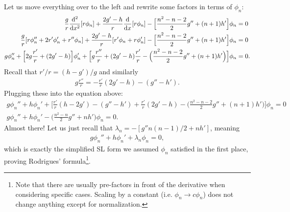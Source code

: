 Let us move everything over to the left and rewrite some factors in terms of $\phi_{n}$:
\begin{align}
    \frac{g}{r} \dv[2]{x} [r\phi_{n}] + \frac{2g' - h}{r} \dv{x} [r\phi_{n}] - \Big[ \frac{n^2-n-2}{2} g'' + (n+1) h' \Big] \phi_{n} &= 0 \nonumber \\
    \frac{g}{r} [ r\phi_{n}'' + 2r'\phi_{n}' + r'' \phi_{n} ] + \frac{2g' - h}{r} [ r'\phi_{n} + r\phi_{n}' ] - \Big[ \frac{n^2 - n - 2}{2} g'' + (n+1) h' \Big] \phi_{n} &= 0 \nonumber \\
    g \phi_{n}'' + \Big[ 2 g \frac{r'}{r} + (2g'-h) \Big] \phi_{n}' + \Big[ g \frac{r''}{r} + (2g' - h) \frac{r'}{r} - \Big( \frac{n^2 - n - 2}{2} g'' + (n+1)h' \Big) \Big] \phi_{n} &= 0
.\end{align}
Recall that $r'/r = (h - g')/g$ and similarly
\begin{eqnarray}
    g\frac{r''}{r} = -\frac{r'}{r} (2g' - h) - (g'' - h')
.\end{eqnarray}
Plugging these into the equation above:
\begin{gather}
    g \phi_{n}'' + h \phi_{n}' + \Big[ \frac{r'}{r}(h - 2g') - (g'' - h') + \frac{r'}{r}(2g' - h) - \Big( \frac{n^2 - n - 2}{2} g'' + (n+1)h' \Big) \Big] \phi_{n} = 0 \nonumber \\
    g \phi_{n}'' + h\phi_{n}' - \Big( \frac{n^2 - n}{2} g'' + n h' \Big) \phi_{n} = 0
.\end{gather}
Almost there!
Let us just recall that $\lambda_{n} = -[ g'' n(n-1)/2 + n h']$, meaning
\begin{eqnarray}
    g \phi_{n}'' + h \phi_{n}' + \lambda_{n} \phi_{n} = 0
,\end{eqnarray}
which is exactly the simplified SL form we assumed $\phi_{n}$ satisfied in the first place, proving Rodrigues' formula\footnote{Note that there are usually pre-factors in front of the derivative when considering specific cases. Scaling by a constant (i.e. $\phi_{n} \rightarrow c \phi_{n}$) does not change anything except for normalization.}.







